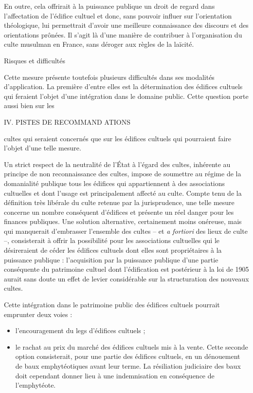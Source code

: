 En outre, cela offrirait à la puissance publique un droit de regard dans
l'affectation de l'édifice cultuel et donc, sans pouvoir influer sur
l'orientation théologique, lui permettrait d'avoir une meilleure
connaissance des discours et des orientations prônées. Il s'agit là
d'une manière de contribuer à l'organisation du culte musulman en
France, sans déroger aux règles de la laïcité.


Risques et difficultés


Cette mesure présente toutefois plusieurs difficultés dans ses modalités
d'application. La première d'entre elles est la détermination des
édifices cultuels qui feraient l'objet d'une intégration dans le domaine
public. Cette question porte aussi bien sur les

IV. PISTES DE RECOMMAND ATIONS

cultes qui seraient concernés que sur les édifices cultuels qui
pourraient faire l'objet d'une telle mesure.

Un strict respect de la neutralité de l'État à l'égard des cultes,
inhérente au principe de non reconnaissance des cultes, impose de
soumettre au régime de la domanialité publique tous les édifices qui
appartiennent à des associations cultuelles et dont l'usage est
principalement affecté au culte. Compte tenu de la définition très
libérale du culte retenue par la jurisprudence, une telle mesure
concerne un nombre conséquent d'édifices et présente un réel danger pour
les finances publiques. Une solution alternative, certainement moins
onéreuse, mais qui manquerait d'embrasser l'ensemble des cultes -- et
\emph{a fortiori} des lieux de culte --, consisterait à offrir la
possibilité pour les associations cultuelles qui le désireraient de
céder les édifices cultuels dont elles sont propriétaires à la puissance
publique : l'acquisition par la puissance publique d'une partie
conséquente du patrimoine cultuel dont l'édification est postérieur à la
loi de 1905 aurait sans doute un effet de levier considérable sur la
structuration des nouveaux cultes.

Cette intégration dans le patrimoine public des édifices cultuels
pourrait emprunter deux voies :


\begin{itemize}
\item
  l'encouragement du legs d'édifices cultuels ;
\item
  le rachat au prix du marché des édifices cultuels mis à la vente.
  Cette seconde option consisterait, pour une partie des édifices
  cultuels, en un dénouement de baux emphytéotiques avant leur terme. La
  résiliation judiciaire des baux doit cependant donner lieu à une
  indemnisation en conséquence de l'emphytéote.
\end{itemize}


